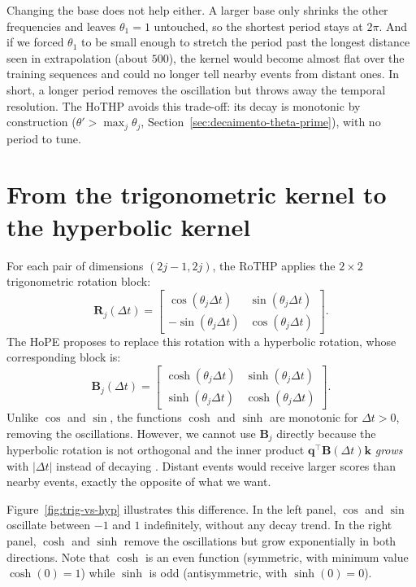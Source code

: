 Changing the base does not help either. A larger base only shrinks the other frequencies and leaves $\theta_1 = 1$ untouched, so the shortest period stays at $2\pi$. And if we forced $\theta_1$ to be small enough to stretch the period past the longest distance seen in extrapolation (about $500$), the kernel would become almost flat over the training sequences and could no longer tell nearby events from distant ones. In short, a longer period removes the oscillation but throws away the temporal resolution. The HoTHP avoids this trade-off: its decay is monotonic by construction ($\theta' > \max_j \theta_j$, Section~\ref{sec:decaimento-theta-prime}), with no period to tune.

\section{From the trigonometric kernel to the hyperbolic kernel}
\label{sec:trig-to-hyp}

For each pair of dimensions $(2j{-}1, 2j)$, the RoTHP applies the $2 \times 2$ trigonometric rotation block:
%
\begin{equation}
    \mathbf{R}_j(\Delta t) = \begin{bmatrix} \cos(\theta_j \Delta t) & \sin(\theta_j \Delta t) \\ -\sin(\theta_j \Delta t) & \cos(\theta_j \Delta t) \end{bmatrix}.
\end{equation}
%
The HoPE \cite{dai_hope_2025} proposes to replace this rotation with a hyperbolic rotation, whose corresponding block is:
%
\begin{equation}
    \mathbf{B}_j(\Delta t) = \begin{bmatrix} \cosh(\theta_j \Delta t) & \sinh(\theta_j \Delta t) \\ \sinh(\theta_j \Delta t) & \cosh(\theta_j \Delta t) \end{bmatrix}.
    \label{eq:bloco-hiperbolico}
\end{equation}
%
Unlike $\cos$ and $\sin$, the functions $\cosh$ and $\sinh$ are monotonic for $\Delta t > 0$, removing the oscillations. However, we cannot use $\mathbf{B}_j$ directly because the hyperbolic rotation is not orthogonal and the inner product $\mathbf{q}^\top \mathbf{B}(\Delta t) \mathbf{k}$ \textit{grows} with $|\Delta t|$ instead of decaying \cite{dai_hope_2025}. Distant events would receive larger scores than nearby events, exactly the opposite of what we want.

Figure~\ref{fig:trig-vs-hyp} illustrates this difference. In the left panel, $\cos$ and $\sin$ oscillate between $-1$ and $1$ indefinitely, without any decay trend. In the right panel, $\cosh$ and $\sinh$ remove the oscillations but grow exponentially in both directions. Note that $\cosh$ is an even function (symmetric, with minimum value $\cosh(0) = 1$) while $\sinh$ is odd (antisymmetric, with $\sinh(0) = 0$).

